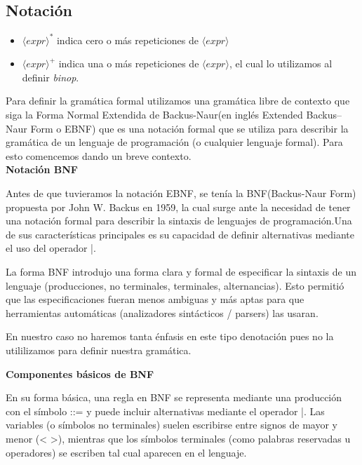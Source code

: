 \documentclass[a4paper,12pt]{article}
\begin{document}
\subsection*{Notación}

\begin{itemize}
    \item $\langle expr \rangle^*$ indica cero o más repeticiones de $\langle expr \rangle$
    \item $\langle expr \rangle^+$ indica una o más repeticiones de $\langle expr \rangle$, el cual lo utilizamos al definir \textit{binop}.
\end{itemize}

Para definir la gramática formal utilizamos una gramática libre de contexto que siga la Forma Normal Extendida de Backus-Naur(en inglés Extended Backus–Naur Form o EBNF) que es una notación formal que se utiliza para describir la gramática de un lenguaje de programación (o cualquier lenguaje formal). Para esto comencemos dando un breve contexto.\\

\textbf{Notación BNF}

Antes de que tuvieramos la notación EBNF, se tenía la BNF(Backus-Naur Form) propuesta por John W. Backus en 1959, la cual surge ante la necesidad de tener una notación formal para describir la sintaxis de lenguajes de programación.Una de sus características principales es su capacidad de definir alternativas mediante el uso del operador |.

La forma BNF introdujo una forma clara y formal de especificar la sintaxis de un lenguaje (producciones, no terminales, terminales, alternancias). Esto permitió que las especificaciones fueran menos ambiguas y más aptas para que herramientas automáticas (analizadores sintácticos / parsers) las usaran. \cite{LambdaSpace04}

En nuestro caso no haremos tanta énfasis en este tipo denotación pues no la utililizamos para definir nuestra gramática. \cite{LambdaSpace04, Dragon, Scott07}


\textbf{Componentes básicos de BNF}

En su forma básica, una regla en BNF se representa mediante una producción con el símbolo ::= y puede incluir alternativas mediante el operador |. Las variables (o símbolos no terminales) suelen escribirse entre signos de mayor y menor (< >), mientras que los símbolos terminales (como palabras reservadas u operadores) se escriben tal cual aparecen en el
lenguaje.\cite{LambdaSpace05, UNAMMaterial,UNAMTesis}
\end{document}
